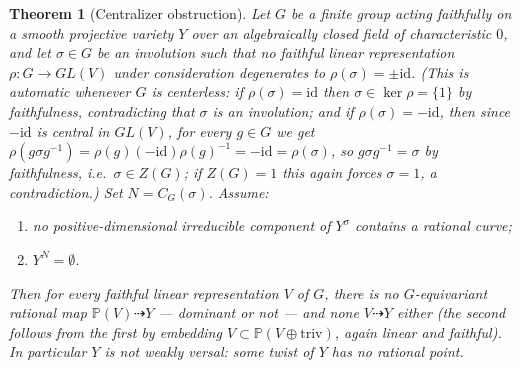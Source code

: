 \documentclass[11pt]{article}
\theoremstyle{plain}
\newtheorem{theorem}{Theorem}[section]
\theoremstyle{definition}
\theoremstyle{remark}
\newcommand{\PP}{\mathbb P}
\newcommand{\dashto}{\dashrightarrow}
\begin{document}
\begin{theorem}[Centralizer obstruction]
\label{thm:main}
Let $G$ be a finite group acting faithfully on a smooth projective
variety $Y$ over an algebraically closed field of characteristic $0$,
and let $\sigma\in G$ be an involution such that no faithful linear
representation $\rho:G\to GL(V)$ under consideration degenerates to
$\rho(\sigma)=\pm\mathrm{id}$. (This is automatic whenever $G$ is
centerless: if $\rho(\sigma)=\mathrm{id}$ then $\sigma\in\ker\rho=\{1\}$
by faithfulness, contradicting that $\sigma$ is an involution; and if
$\rho(\sigma)=-\mathrm{id}$, then since $-\mathrm{id}$ is central in
$GL(V)$, for every $g\in G$ we get $\rho(g\sigma g^{-1})=\rho(g)(-
\mathrm{id})\rho(g)^{-1}=-\mathrm{id}=\rho(\sigma)$, so $g\sigma
g^{-1}=\sigma$ by faithfulness, i.e.\ $\sigma\in Z(G)$; if $Z(G)=1$ this
again forces $\sigma=1$, a contradiction.) Set $N=C_G(\sigma)$. Assume:
\begin{enumerate}[label=(\alph*)]
\item no positive-dimensional irreducible component of $Y^\sigma$
contains a rational curve;
\item $Y^N=\emptyset$.
\end{enumerate}
Then for every faithful linear representation $V$ of $G$, there is no
$G$-equivariant rational map $\PP(V)\dashto Y$ --- dominant or not ---
and none $V\dashto Y$ either (the second follows from the first by
embedding $V\subset\PP(V\oplus\mathrm{triv})$, again linear and
faithful). In particular $Y$ is not weakly versal: some twist of $Y$
has no rational point.
\end{theorem}
\end{document}
